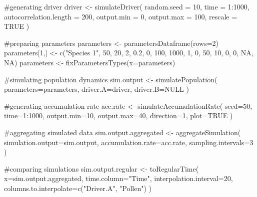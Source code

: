 \documentclass[letterpaper]{book}
\begin{document}
%
\begin{Examples}
\begin{ExampleCode}
#generating driver
driver <- simulateDriver(
 random.seed = 10,
 time = 1:1000,
 autocorrelation.length = 200,
 output.min = 0,
 output.max = 100,
 rescale = TRUE
 )

#preparing parameters
parameters <- parametersDataframe(rows=2)
parameters[1,] <- c("Species 1", 50, 20, 2, 0.2, 0, 100, 1000, 1, 0, 50, 10, 0, 0, NA, NA)
parameters <- fixParametersTypes(x=parameters)

#simulating population dynamics
sim.output <- simulatePopulation(
 parameters=parameters,
 driver.A=driver,
 driver.B=NULL
 )

#generating accumulation rate
acc.rate <- simulateAccumulationRate(
 seed=50,
 time=1:1000,
 output.min=10,
 output.max=40,
 direction=1,
 plot=TRUE
 )

#aggregating simulated data
sim.output.aggregated <- aggregateSimulation(
 simulation.output=sim.output,
 accumulation.rate=acc.rate,
 sampling.intervals=3
 )

#comparing simulations
sim.output.regular <- toRegularTime(
 x=sim.output.aggregated,
 time.column="Time",
 interpolation.interval=20,
 columns.to.interpolate=c("Driver.A", "Pollen")
 )

\end{ExampleCode}
\end{Examples}
\printindex{}
\end{document}
